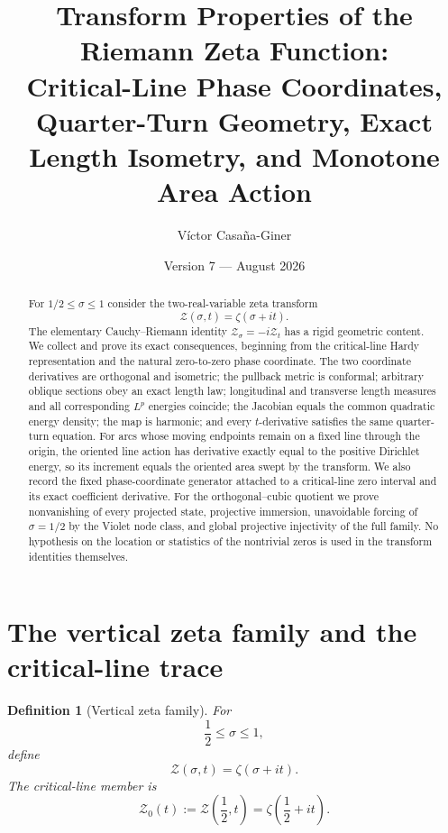 \documentclass[11pt]{amsart}
\title[Transform Properties of the Riemann Zeta Function]{Transform Properties of the Riemann Zeta Function:\\Critical-Line Phase Coordinates, Quarter-Turn Geometry, Exact Length Isometry, and Monotone Area Action}
\author{Víctor Casaña-Giner}
\date{Version 7 --- August 2026}
\numberwithin{equation}{section}
\newtheorem{definition}[theorem]{Definition}
\newcommand{\Zcal}{\mathcal Z}
\begin{document}
\begin{abstract}
For $1/2\le \sigma\le 1$ consider the two-real-variable zeta transform
\[
\Zcal(\sigma,t)=\zeta(\sigma+it).
\]
The elementary Cauchy--Riemann identity $\Zcal_\sigma=-i\Zcal_t$ has a rigid geometric content.  We collect and prove its exact consequences, beginning from the critical-line Hardy representation and the natural zero-to-zero phase coordinate.  The two coordinate derivatives are orthogonal and isometric; the pullback metric is conformal; arbitrary oblique sections obey an exact length law; longitudinal and transverse length measures and all corresponding $L^p$ energies coincide; the Jacobian equals the common quadratic energy density; the map is harmonic; and every $t$-derivative satisfies the same quarter-turn equation.  For arcs whose moving endpoints remain on a fixed line through the origin, the oriented line action has derivative exactly equal to the positive Dirichlet energy, so its increment equals the oriented area swept by the transform.  We also record the fixed phase-coordinate generator attached to a critical-line zero interval and its exact coefficient derivative.  For the orthogonal--cubic quotient we prove nonvanishing of every projected state, projective immersion, unavoidable forcing of $\sigma=1/2$ by the Violet node class, and global projective injectivity of the full family.  No hypothesis on the location or statistics of the nontrivial zeros is used in the transform identities themselves.
\end{abstract}

\maketitle
\tableofcontents
\bigskip

\section{The vertical zeta family and the critical-line trace}

\begin{definition}[Vertical zeta family]
For
\[
\frac12\le \sigma\le 1,
\]
define
\begin{equation}
\boxed{\Zcal(\sigma,t)=\zeta(\sigma+it).}
\label{eq:zeta-transform}
\end{equation}
The critical-line member is
\begin{equation}
\boxed{\Zcal_0(t):=\Zcal\!\left(\frac12,t\right)=\zeta\!\left(\frac12+it\right).}
\label{eq:critical-member}
\end{equation}
\end{definition}
\end{document}
